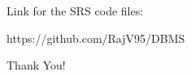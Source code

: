 \documentclass[12pt]{article}
\begin{document}
\newpage
{}

\clearpage
\newpage

\noindent \Large Link for the SRS code files: 
\begin{center}
    https://github.com/RajV95/DBMS
\end{center}

\begin{center}    
    \Huge Thank You!    
\end{center}
    
\end{document}
